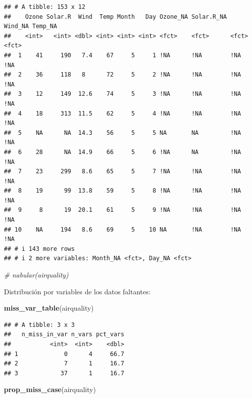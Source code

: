 \documentclass[
]{book}
\newenvironment{Shaded}{\begin{snugshade}}{\end{snugshade}}
\newcommand{\CommentTok}[1]{\textcolor[rgb]{0.56,0.35,0.01}{\textit{#1}}}
\newcommand{\FunctionTok}[1]{\textcolor[rgb]{0.13,0.29,0.53}{\textbf{#1}}}
\newcommand{\NormalTok}[1]{#1}
\begin{document}
\begin{verbatim}
## # A tibble: 153 x 12
##    Ozone Solar.R  Wind  Temp Month   Day Ozone_NA Solar.R_NA Wind_NA Temp_NA
##    <int>   <int> <dbl> <int> <int> <int> <fct>    <fct>      <fct>   <fct>  
##  1    41     190   7.4    67     5     1 !NA      !NA        !NA     !NA    
##  2    36     118   8      72     5     2 !NA      !NA        !NA     !NA    
##  3    12     149  12.6    74     5     3 !NA      !NA        !NA     !NA    
##  4    18     313  11.5    62     5     4 !NA      !NA        !NA     !NA    
##  5    NA      NA  14.3    56     5     5 NA       NA         !NA     !NA    
##  6    28      NA  14.9    66     5     6 !NA      NA         !NA     !NA    
##  7    23     299   8.6    65     5     7 !NA      !NA        !NA     !NA    
##  8    19      99  13.8    59     5     8 !NA      !NA        !NA     !NA    
##  9     8      19  20.1    61     5     9 !NA      !NA        !NA     !NA    
## 10    NA     194   8.6    69     5    10 NA       !NA        !NA     !NA    
## # i 143 more rows
## # i 2 more variables: Month_NA <fct>, Day_NA <fct>
\end{verbatim}

\begin{Shaded}
\begin{Highlighting}[]
\CommentTok{\# nabular(airquality)}
\end{Highlighting}
\end{Shaded}

Distribución por variables de los datos faltantes:

\begin{Shaded}
\begin{Highlighting}[]
\FunctionTok{miss\_var\_table}\NormalTok{(airquality) }
\end{Highlighting}
\end{Shaded}

\begin{verbatim}
## # A tibble: 3 x 3
##   n_miss_in_var n_vars pct_vars
##           <int>  <int>    <dbl>
## 1             0      4     66.7
## 2             7      1     16.7
## 3            37      1     16.7
\end{verbatim}

\begin{Shaded}
\begin{Highlighting}[]
\FunctionTok{prop\_miss\_case}\NormalTok{(airquality)}
\end{Highlighting}
\end{Shaded}
\end{document}

